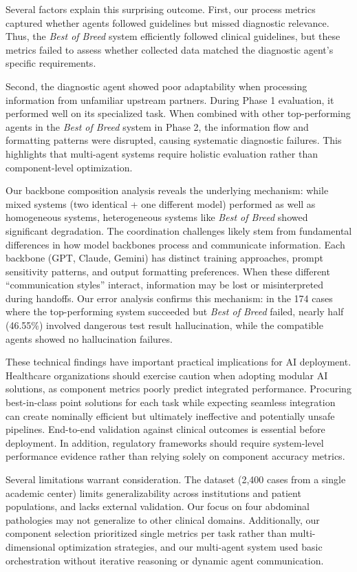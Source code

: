 \documentclass[manuscript, nonacm]{acmart}
\begin{document}
Several factors explain this surprising outcome. First, our process metrics captured whether agents followed guidelines but missed diagnostic relevance. Thus, the \textit{Best of Breed} system efficiently followed clinical guidelines, but these metrics failed to assess whether collected data matched the diagnostic agent's specific requirements. 

Second, the diagnostic agent showed poor adaptability when processing information from unfamiliar upstream partners. During Phase 1 evaluation, it performed well on its specialized task. When combined with other top-performing agents in the \textit{Best of Breed} system in Phase 2, the information flow and formatting patterns were disrupted, causing systematic diagnostic failures. This highlights that multi-agent systems require holistic evaluation rather than component-level optimization.

Our backbone composition analysis reveals the underlying mechanism: while mixed systems (two identical + one different model) performed as well as homogeneous systems, heterogeneous systems like \textit{Best of Breed} showed significant degradation. The coordination challenges likely stem from fundamental differences in how model backbones process and communicate information. Each backbone (GPT, Claude, Gemini) has distinct training approaches, prompt sensitivity patterns, and output formatting preferences. When these different ``communication styles'' interact, information may be lost or misinterpreted during handoffs. Our error analysis confirms this mechanism: in the 174 cases where the top-performing system succeeded but \textit{Best of Breed} failed, nearly half (46.55\%) involved dangerous test result hallucination, while the compatible agents showed no hallucination failures.

These technical findings have important practical implications for AI deployment. Healthcare organizations should exercise caution when adopting modular AI solutions, as component metrics poorly predict integrated performance. Procuring best-in-class point solutions for each task while expecting seamless integration can create nominally efficient but ultimately ineffective and potentially unsafe pipelines. End-to-end validation against clinical outcomes is essential before deployment. In addition, regulatory frameworks should require system-level performance evidence rather than relying solely on component accuracy metrics.

Several limitations warrant consideration. The dataset (2,400 cases from a single academic center) limits generalizability across institutions and patient populations, and lacks external validation. Our focus on four abdominal pathologies may not generalize to other clinical domains. Additionally, our component selection prioritized single metrics per task rather than multi-dimensional optimization strategies, and our multi-agent system used basic orchestration without iterative reasoning or dynamic agent communication.
\end{document}

